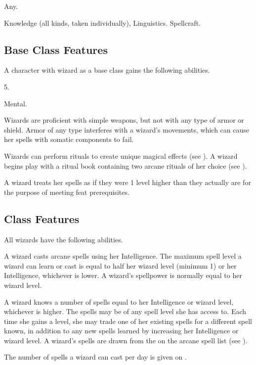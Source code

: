  Any.

 Knowledge (all kinds, taken individually), Linguistics.
 Spellcraft.

\subsection{Base Class Features}
A character with wizard as a base class gains the following abilities.

 5.

  Mental.

Wizards are proficient with simple weapons, but not with any type of armor or shield.
Armor of any type interferes with a wizard's movements, which can cause her spells with somatic components to fail.

Wizards can perform rituals to create unique magical effects (see ).
A wizard begins play with a ritual book containing two arcane rituals of her choice (see ).

A wizard treats her spells as if they were 1 level higher than they actually are for the purpose of meeting feat prerequisites.

\subsection{Class Features}
All wizards have the following abilities.

A wizard casts arcane spells using her Intelligence.
The maximum spell level a wizard can learn or cast is equal to half her wizard level (minimum 1) or her Intelligence, whichever is lower.
A wizard's spellpower is normally equal to her wizard level.

A wizard knows a number of spells equal to her Intelligence or wizard level, whichever is higher.
The spells may be of any spell level she has access to.
Each time she gains a level, she may trade one of her existing spells for a different spell known, in addition to any new spells learned by increasing her Intelligence or wizard level.
A wizard's spells are drawn from the  on the arcane spell list (see ).

The number of spells a wizard can cast per day is given on .

